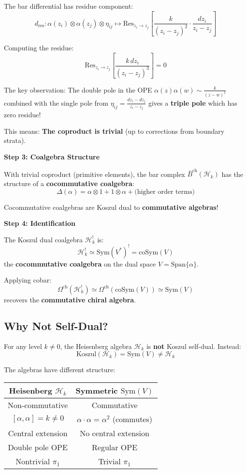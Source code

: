 The bar differential has residue component:
$$d_{\text{res}}: \alpha(z_i) \otimes \alpha(z_j) \otimes \eta_{ij} 
   \mapsto \text{Res}_{z_i \to z_j}\left[\frac{k}{(z_i-z_j)^2} \cdot \frac{dz_i}{z_i-z_j}\right]$$

Computing the residue:
$$\text{Res}_{z_i \to z_j}\left[\frac{k \, dz_i}{(z_i-z_j)^3}\right] = 0$$

The key observation: The double pole in the OPE $\alpha(z)\alpha(w) \sim \frac{k}{(z-w)^2}$ 
combined with the single pole from $\eta_{ij} = \frac{dz_i - dz_j}{z_i - z_j}$ gives a 
\textbf{triple pole} which has zero residue!

This means: \textbf{The coproduct is trivial} (up to corrections from boundary strata).

\textbf{Step 3: Coalgebra Structure}

With trivial coproduct (primitive elements), the bar complex $\bar{B}^{\text{ch}}(\mathcal{H}_k)$ 
has the structure of a \textbf{cocommutative coalgebra}:
$$\Delta(\alpha) = \alpha \otimes 1 + 1 \otimes \alpha + \text{(higher order terms)}$$

Cocommutative coalgebras are Koszul dual to \textbf{commutative algebras}!

\textbf{Step 4: Identification}

The Koszul dual coalgebra $\mathcal{H}_k^!$ is:
$$\mathcal{H}_k^! \simeq \text{Sym}(V^*)^! = \text{coSym}(V)$$
the \textbf{cocommutative coalgebra} on the dual space $V = \text{Span}\{\alpha\}$.

Applying cobar:
$$\Omega^{\text{ch}}(\mathcal{H}_k^!) \simeq \Omega^{\text{ch}}(\text{coSym}(V)) 
   \simeq \text{Sym}(V)$$
recovers the \textbf{commutative chiral algebra}.

\subsection{Why Not Self-Dual?}

\begin{theorem}
\label{thm:heisenberg-not-self-dual}
For any level $k \neq 0$, the Heisenberg algebra $\mathcal{H}_k$ is \textbf{not} Koszul 
self-dual. Instead:
$$\text{Koszul}(\mathcal{H}_k) = \text{Sym}(V) \neq \mathcal{H}_k$$

The algebras have different structure:
\begin{center}
\begin{tabular}{c|c}
\textbf{Heisenberg } $\mathcal{H}_k$ & \textbf{Symmetric } $\text{Sym}(V)$ \\ \hline
Non-commutative & Commutative \\
$[\alpha, \alpha] = k \neq 0$ & $\alpha \cdot \alpha = \alpha^2$ (commutes) \\
Central extension & No central extension \\
Double pole OPE & Regular OPE \\
Nontrivial $\pi_1$ & Trivial $\pi_1$
\end{tabular}
\end{center}
\end{theorem}

